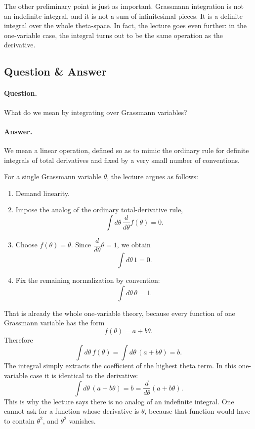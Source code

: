 The other preliminary point is just as important. Grassmann integration is not an indefinite integral, and it is not a sum of infinitesimal pieces. It is a definite integral over the whole theta-space. In fact, the lecture goes even further: in the one-variable case, the integral turns out to be the same operation as the derivative.

\subsection{Question \& Answer}

\paragraph{Question.} What do we mean by integrating over Grassmann variables?

\paragraph{Answer.} We mean a linear operation, defined so as to mimic the ordinary rule for definite integrals of total derivatives and fixed by a very small number of conventions.

For a single Grassmann variable \(\theta\), the lecture argues as follows:
\begin{enumerate}
\item Demand linearity.
\item Impose the analog of the ordinary total-derivative rule,
\begin{equation}
\int d\theta\,\frac{d}{d\theta}f(\theta)=0.
\end{equation}
\item Choose \(f(\theta)=\theta\). Since \(\dfrac{d}{d\theta}\theta=1\), we obtain
\begin{equation}
\int d\theta\,1=0.
\end{equation}
\item Fix the remaining normalization by convention:
\begin{equation}
\int d\theta\,\theta=1.
\end{equation}
\end{enumerate}
That is already the whole one-variable theory, because every function of one Grassmann variable has the form
\begin{equation}
f(\theta)=a+b\theta.
\end{equation}
Therefore
\begin{equation}
\int d\theta\,f(\theta)=\int d\theta\,(a+b\theta)=b.
\end{equation}
The integral simply extracts the coefficient of the highest theta term. In this one-variable case it is identical to the derivative:
\begin{equation}
\int d\theta\,(a+b\theta)=b=\frac{d}{d\theta}(a+b\theta).
\end{equation}
This is why the lecture says there is no analog of an indefinite integral. One cannot ask for a function whose derivative is \(\theta\), because that function would have to contain \(\theta^2\), and \(\theta^2\) vanishes.

